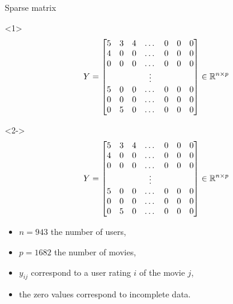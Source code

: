 \documentclass[unknownkeysallowed]{beamer}
\begin{document}
\begin{frame}{Sparse matrix}
\begin{onlyenv}<1>
    $$Y=\begin{bmatrix}
5 & 3 & 4 & \dots & 0 & 0 & 0\\
4 & 0 & 0 & \dots & 0 & 0 & 0\\
0 & 0 & 0 & \dots & 0 & 0 & 0\\
  &   &   & \vdots\\
5 & 0 & 0 & \dots & 0 & 0 & 0\\
0 & 0 & 0 & \dots & 0 & 0 & 0\\
0 & 5 & 0 & \dots & 0 & 0 & 0\\
\end{bmatrix} \in \mathbb{R}^{n \times p}$$
\end{onlyenv}
\begin{onlyenv}<2->
    $$Y=\begin{bmatrix}
5 & 3 & 4 & \dots & 0 & 0 & 0\\
4 & 0 & 0 & \dots & 0 & 0 & 0\\
0 & 0 & 0 & \dots & 0 & 0 & 0\\
  &   &   & \vdots\\
5 & 0 & 0 & \dots & 0 & 0 & 0\\
0 & 0 & 0 & \dots & 0 & 0 & 0\\
0 & 5 & 0 & \dots & 0 & 0 & 0\\
\end{bmatrix} \in \mathbb{R}^{n \times p}$$
\begin{itemize}
    \item $n=943$ the number of users, 
    \item $p=1682$ the number of movies, 
    \item $y_{ij}$ correspond to a user rating $i$ of the movie $j$,
    \item the zero values correspond to incomplete data.
\end{itemize}
\end{onlyenv}
\end{frame}
\end{document}
